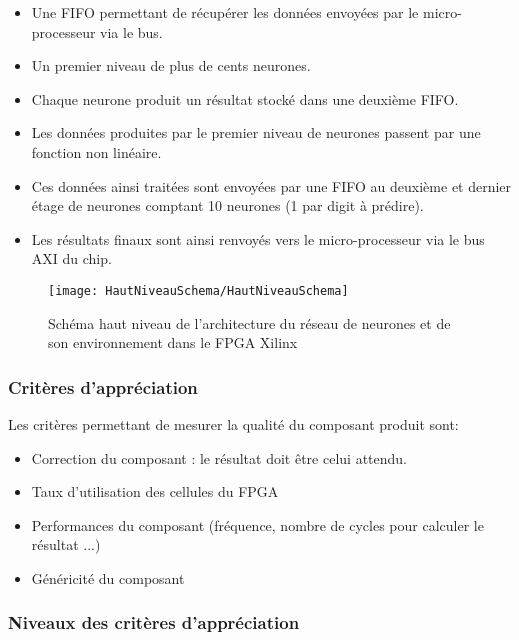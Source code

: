 \begin{itemize}
	\item Une FIFO permettant de récupérer les données envoyées par le micro-processeur via le bus.
	\item Un premier niveau de plus de cents neurones.
	\item Chaque neurone produit un résultat stocké dans une deuxième FIFO.
	\item Les données produites par le premier niveau de neurones passent par une fonction non linéaire.
	\item Ces données ainsi traitées sont envoyées par une FIFO au deuxième et dernier étage de neurones comptant 10 neurones (1 par digit à prédire).
	\item Les résultats finaux sont ainsi renvoyés vers le micro-processeur via le bus AXI du chip.
\end{itemize}
	

\begin{figure}[htbp]
\begin{center}
\texttt{[image: HautNiveauSchema/HautNiveauSchema]}
\caption{Schéma haut niveau de l'architecture du réseau de neurones et de son environnement dans le FPGA Xilinx}
\label{fig:HautNiveauSchema}
\end{center}
\end{figure}

\subsubsection{Critères d’appréciation}

Les critères permettant de mesurer la qualité du composant produit sont:
\begin{itemize}
	\item Correction du composant : le résultat doit être celui attendu.
	\item Taux d'utilisation des cellules du FPGA
	\item Performances du composant (fréquence, nombre de cycles pour
		calculer le résultat ...)
	\item Généricité du composant
\end{itemize}

\subsubsection{Niveaux des critères d’appréciation}

